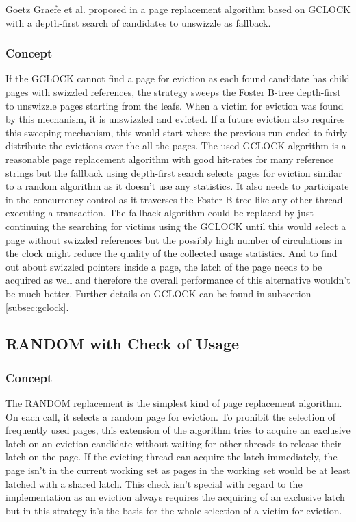 	Goetz Graefe et al. proposed in \cite{Graefe:2014} a page replacement algorithm based on GCLOCK with a depth-first search of candidates to unswizzle as fallback.

\subsubsection{Concept}

	 If the GCLOCK cannot find a page for eviction as each found candidate has child pages with swizzled references, the strategy sweeps the Foster B-tree depth-first to unswizzle pages starting from the leafs. When a victim for eviction was found by this mechanism, it is unswizzled and evicted. If a future eviction also requires this sweeping mechanism, this would start where the previous run ended to fairly distribute the evictions over the all the pages. The used GCLOCK algorithm is a reasonable page replacement algorithm with good hit-rates for many reference strings but the fallback using depth-first search selects pages for eviction similar to a random algorithm as it doesn't use any statistics. It also needs to participate in the concurrency control as it traverses the Foster B-tree like any other thread executing a transaction. The fallback algorithm could be replaced by just continuing the searching for victims using the GCLOCK until this would select a page without swizzled references but the possibly high number of circulations in the clock might reduce the quality of the collected usage statistics. And to find out about swizzled pointers inside a page, the latch of the page needs to be acquired as well and therefore the overall performance of this alternative wouldn't be much better. Further details on GCLOCK can be found in subsection \ref{subsec:gclock}.

\subsection{RANDOM with Check of Usage}

\subsubsection{Concept}
	
	The RANDOM replacement is the simplest kind of page replacement algorithm. On each call, it selects a random page for eviction. To prohibit the selection of frequently used pages, this extension of the algorithm tries to acquire an exclusive latch on an eviction candidate without waiting for other threads to release their latch on the page. If the evicting thread can acquire the latch immediately, the page isn't in the current working set as pages in the working set would be at least latched with a shared latch. This check isn't special with regard to the implementation as an eviction always requires the acquiring of an exclusive latch but in this strategy it's the basis for the whole selection of a victim for eviction.

